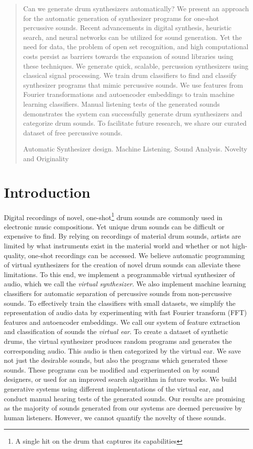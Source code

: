 \documentclass[runningheads,a4paper]{llncs}
\newcommand{\keywords}[1]{\par\addvspace\baselineskip
\noindent\keywordname\enspace\ignorespaces#1}
\begin{document}
\begin{abstract}
Can we generate drum synthesizers automatically?
We present an approach for the automatic generation of synthesizer programs for one-shot percussive sounds. 
Recent advancements in digital synthesis, heuristic search, and neural networks can be utilized for sound generation. 
Yet the need for data, the problem of open set recognition, and high computational costs persist as barriers towards the expansion of sound libraries using these techniques. 
We generate quick, scalable, percussion synthesizers using classical signal processing. 
We train drum classifiers to find and classify synthesizer programs that mimic percussive sounds. 
We use features from Fourier transformations and autoencoder embeddings to train machine learning classifiers.
Manual listening tests of the generated sounds demonstrates the system can successfully generate drum synthesizers and categorize drum sounds.
To facilitate future research, we share our curated dataset of free percussive sounds.
\keywords{Automatic Synthesizer design. Machine Listening. Sound Analysis. Novelty and Originality}
\end{abstract}


\section{Introduction} 
Digital recordings of novel, one-shot\footnote{A single hit on the drum that captures its capabilities} drum sounds are commonly used in  electronic music compositions. Yet unique drum sounds can be difficult or expensive to find. By relying on recordings of material drum sounds, artists are limited by what instruments exist in the material world and whether or not high-quality, one-shot recordings can be accessed. We believe automatic programming of virtual synthesizers for the creation of novel drum sounds can alleviate these limitations. To this end, we implement a programmable virtual synthesizer of audio, which we call the \emph{virtual synthesizer}. We also implement machine learning classifiers for automatic separation of percussive sounds from non-percussive sounds. To effectively train the classifiers with small datasets, we simplify the representation of audio data by experimenting with fast Fourier transform (FFT) features and autoencoder embeddings. We call our system of feature extraction and classification of sounds the \emph{virtual ear}. To create a dataset of synthetic drums, the virtual synthesizer produces random programs and generates the corresponding audio. This audio is then categorized by the virtual ear. We save not just the desirable sounds, but also the programs which generated these sounds. These programs can be modified and experimented on by sound designers, or used for an improved search algorithm in future works. We build generative systems using different implementations of the virtual ear, and conduct manual hearing tests of the generated sounds. Our results are promising as the majority of sounds generated from our systems are deemed percussive by human listeners. However, we cannot quantify the novelty of these sounds. 
\end{document}
